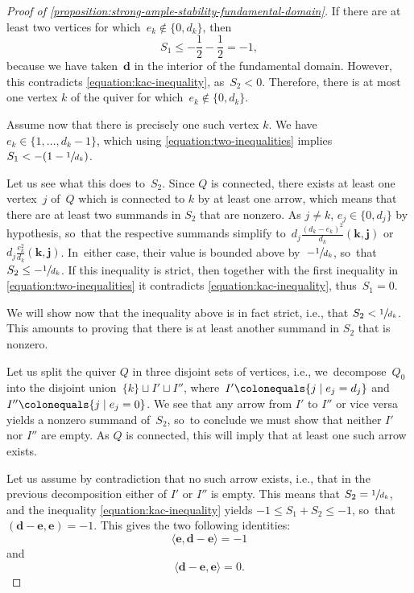 \documentclass[JEP,XML,SOM,Unicode,NoEqCountersInSection,published]{cedram}
\theoremstyle{plain}
\theoremstyle{definition}
\newcommand\tuple[1]{\ensuremath{{\boldsymbol{#1}}}}
\begin{document}
\begin{proof}[Proof of \cref{proposition:strong-ample-stability-fundamental-domain}]
If there are at least two vertices for which~$e_k\not\in \{0,d_k\}$,
then
\begin{equation*}
S_1\leq-\frac{1}{2}-\frac{1}{2}=-1,
\end{equation*}
because we have taken~$\tuple{d}$ in the interior of the fundamental domain.
However, this contradicts \eqref{equation:kac-inequality},
as~$S_2<0$.
Therefore, there is at most one vertex $k$ of the quiver
for which~$e_k \notin \{0,d_k\}$.

Assume now that there is precisely one such vertex $k$.
We have~$e_k\in\{1,\ldots,d_k-1\}$, which using \eqref{equation:two-inequalities}
implies $S_1 < -(1 - \sfrac{1}{d_k})$.

Let us see what this does to~$S_2$.
Since $Q$ is connected, there exists at least one vertex~$j$ of~$Q$
which is connected to $k$ by at least one arrow,
which means that there are at least two summands in $S_2$ that are nonzero.
As $j \neq k$, $e_j \in \{0, d_j\}$ by hypothesis, so~that the respective summands simplify to~$d_j\frac{(d_k-e_k)^2}{d_k}(\tuple{k},\tuple{j})$
or~$d_j\frac{e_k^2}{d_k}(\tuple{k},\tuple{j})$. In~either case, their value is bounded above by~$-\sfrac{1}{d_k}$, so~that~$S_2\leq-\sfrac{1}{d_k}$.
If this inequality is strict,
then together with the first inequality in \eqref{equation:two-inequalities}
it contradicts \eqref{equation:kac-inequality},
thus~$S_1=0$.

We will show now that the inequality above is in fact strict, i.e., that $S_2 < \sfrac{1}{d_k}$.
This amounts to proving that there is at least another summand in $S_2$ that is nonzero.

Let us split the quiver $Q$ in three disjoint sets of vertices,
i.e., we~decompose~$Q_0$ into
the disjoint union~$\{k\} \sqcup I' \sqcup I''$,
where~$I' \colonequals \{j \mid e_j = d_j\}$ and~$I'' \colonequals \{j \mid e_j = 0\}$.
We see that any arrow from $I'$ to $I''$ or vice versa yields a nonzero summand of~$S_2$, so~to conclude we must show that neither $I'$ nor $I''$ are empty.
As $Q$ is connected, this will imply that at least one such arrow exists.

Let us assume by contradiction that no such arrow exists, i.e.,
that in the previous decomposition either of $I'$ or $I''$ is empty.
This means that $S_2 = \sfrac{1}{d_k}$, and the inequality \eqref{equation:kac-inequality}
yields $-1 \leq S_1 + S_2 \leq -1$, so~that~$(\tuple{d} - \tuple{e}, \tuple{e}) = -1$.
This gives the two following identities:
\begin{equation}\label{equation:contradiction-1}
\langle \tuple{e}, \tuple{d} - \tuple{e} \rangle = -1
\end{equation}
and
\begin{equation}\label{equation:contradiction-2}
\langle \tuple{d} - \tuple{e}, \tuple{e} \rangle = 0.
\end{equation}


\end{proof}
\end{document}
